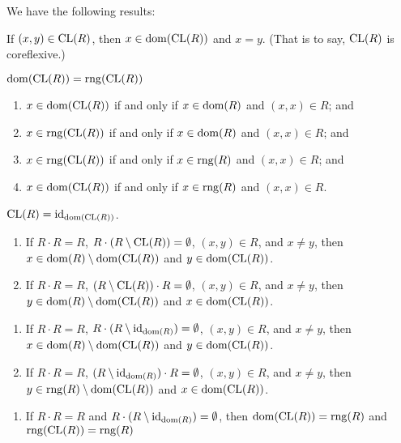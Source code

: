 \documentclass{article}
\begin{document}
We have the following results:
\begin{thm}
\item\label{sysrel:25} If $(x,y)\in\operatorname{CL}(R)$, then $x\in\operatorname{dom}(\operatorname{CL}(R))$ and $x=y$.
(That is to say, $\operatorname{CL}(R)$ is coreflexive.)
\item\label{sysrel:26} $\operatorname{dom}(\operatorname{CL}(R))=\operatorname{rng}(\operatorname{CL}(R))$
\item\label{sysrel:27}
  \begin{enumerate}[label=(\roman*)]
  \item $x\in\operatorname{dom}(\operatorname{CL}(R))$ if and only if $x\in\operatorname{dom}(R)$ and $(x,x)\in R$; and
  \item $x\in\operatorname{rng}(\operatorname{CL}(R))$ if and only if $x\in\operatorname{dom}(R)$ and $(x,x)\in R$; and
  \item $x\in\operatorname{rng}(\operatorname{CL}(R))$ if and only if $x\in\operatorname{rng}(R)$ and $(x,x)\in R$; and
  \item $x\in\operatorname{dom}(\operatorname{CL}(R))$ if and only if $x\in\operatorname{rng}(R)$ and $(x,x)\in R$.
  \end{enumerate}
\item\label{sysrel:28} $\operatorname{CL}(R)=\operatorname{id}_{\operatorname{dom}(\operatorname{CL}(R))}$.
\item\label{sysrel:29} 
  \begin{enumerate}[label=(\roman*)]
  \item If $R\cdot R=R$, $R\cdot(R\setminus\operatorname{CL}(R))=\emptyset$, $(x,y)\in R$,
    and $x\neq y$, then $x\in\operatorname{dom}(R)\setminus\operatorname{dom}(\operatorname{CL}(R))$ and $y\in\operatorname{dom}(\operatorname{CL}(R))$.
  \item If $R\cdot R=R$, $(R\setminus\operatorname{CL}(R))\cdot R=\emptyset$, $(x,y)\in R$,
    and $x\neq y$, then $y\in\operatorname{dom}(R)\setminus\operatorname{dom}(\operatorname{CL}(R))$ and $x\in\operatorname{dom}(\operatorname{CL}(R))$.
  \end{enumerate}
\item\label{sysrel:30} 
  \begin{enumerate}[label=(\roman*)]
  \item If $R\cdot R=R$, $R\cdot(R\setminus\operatorname{id}_{\operatorname{dom}(R)})=\emptyset$,
    $(x,y)\in R$, and $x\neq y$, then
    $x\in\operatorname{dom}(R)\setminus\operatorname{dom}(\operatorname{CL}(R))$
    and $y\in\operatorname{dom}(\operatorname{CL}(R))$.
  \item If $R\cdot R=R$, $(R\setminus\operatorname{id}_{\operatorname{dom}(R)})\cdot R=\emptyset$, $(x,y)\in R$,
    and $x\neq y$, then $y\in\operatorname{rng}(R)\setminus\operatorname{dom}(\operatorname{CL}(R))$ and $x\in\operatorname{dom}(\operatorname{CL}(R))$.
  \end{enumerate}
\item\label{sysrel:31} 
  \begin{enumerate}[label=(\roman*)]
  \item If $R\cdot R=R$ and $R\cdot(R\setminus\operatorname{id}_{\operatorname{dom}(R)})=\emptyset$,
    then $\operatorname{dom}(\operatorname{CL}(R))=\operatorname{rng}(R)$ and $\operatorname{rng}(\operatorname{CL}(R))=\operatorname{rng}(R)$

\end{enumerate}
\end{thm}
\end{document}
